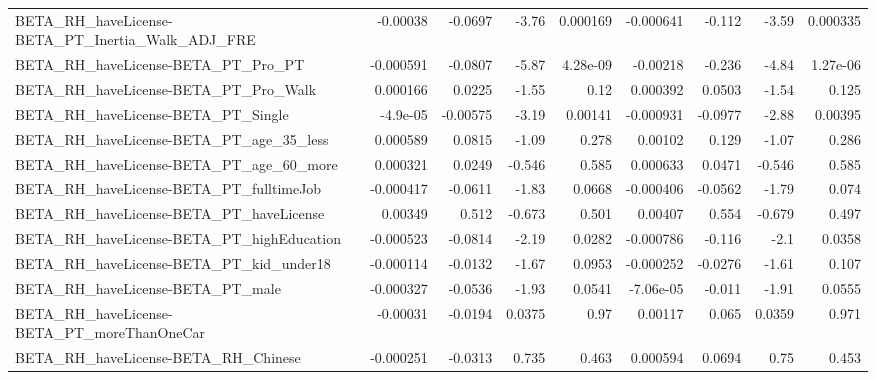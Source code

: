 \begin{tabular}{lrrrrrrrr}
BETA\_RH\_haveLicense-BETA\_PT\_Inertia\_Walk\_ADJ\_FRE   &    -0.00038 &      -0.0697 &    -3.76 & 0.000169 &  -0.000641 &      -0.112 &        -3.59 &      0.000335 \\
BETA\_RH\_haveLicense-BETA\_PT\_Pro\_PT                 &   -0.000591 &      -0.0807 &    -5.87 & 4.28e-09 &   -0.00218 &      -0.236 &        -4.84 &      1.27e-06 \\
BETA\_RH\_haveLicense-BETA\_PT\_Pro\_Walk               &    0.000166 &       0.0225 &    -1.55 &     0.12 &   0.000392 &      0.0503 &        -1.54 &         0.125 \\
BETA\_RH\_haveLicense-BETA\_PT\_Single                 &    -4.9e-05 &     -0.00575 &    -3.19 &  0.00141 &  -0.000931 &     -0.0977 &        -2.88 &       0.00395 \\
BETA\_RH\_haveLicense-BETA\_PT\_age\_35\_less            &    0.000589 &       0.0815 &    -1.09 &    0.278 &    0.00102 &       0.129 &        -1.07 &         0.286 \\
BETA\_RH\_haveLicense-BETA\_PT\_age\_60\_more            &    0.000321 &       0.0249 &   -0.546 &    0.585 &   0.000633 &      0.0471 &       -0.546 &         0.585 \\
BETA\_RH\_haveLicense-BETA\_PT\_fulltimeJob            &   -0.000417 &      -0.0611 &    -1.83 &   0.0668 &  -0.000406 &     -0.0562 &        -1.79 &         0.074 \\
BETA\_RH\_haveLicense-BETA\_PT\_haveLicense            &     0.00349 &        0.512 &   -0.673 &    0.501 &    0.00407 &       0.554 &       -0.679 &         0.497 \\
BETA\_RH\_haveLicense-BETA\_PT\_highEducation          &   -0.000523 &      -0.0814 &    -2.19 &   0.0282 &  -0.000786 &      -0.116 &         -2.1 &        0.0358 \\
BETA\_RH\_haveLicense-BETA\_PT\_kid\_under18            &   -0.000114 &      -0.0132 &    -1.67 &   0.0953 &  -0.000252 &     -0.0276 &        -1.61 &         0.107 \\
BETA\_RH\_haveLicense-BETA\_PT\_male                   &   -0.000327 &      -0.0536 &    -1.93 &   0.0541 &  -7.06e-05 &      -0.011 &        -1.91 &        0.0555 \\
BETA\_RH\_haveLicense-BETA\_PT\_moreThanOneCar         &    -0.00031 &      -0.0194 &   0.0375 &     0.97 &    0.00117 &       0.065 &       0.0359 &         0.971 \\
BETA\_RH\_haveLicense-BETA\_RH\_Chinese                &   -0.000251 &      -0.0313 &    0.735 &    0.463 &   0.000594 &      0.0694 &         0.75 &         0.453 \\

\end{tabular}
